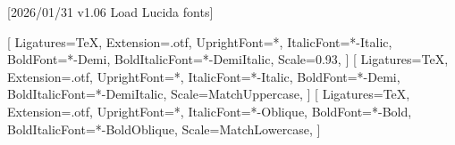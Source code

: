
[2026/01/31 v1.06 Load Lucida fonts]



\ifpdftex
	\RequirePackage[LY1]{fontenc}
	\RequirePackage{bm}
\else
    \RequirePackage[warnings-off={mathtools-colon,mathtools-overbracket},mathbf=sym]{unicode-math}

    
    \setmainfont{LucidaBrightOT}[%
          Ligatures=TeX,
          Extension=.otf,
          UprightFont=*,
          ItalicFont=*-Italic,
          BoldFont=*-Demi,
    	  BoldItalicFont=*-DemiItalic,
    	  Scale=0.93,%
      ]
    \setsansfont{LucidaSansOT}[%
          Ligatures=TeX,
          Extension=.otf,
          UprightFont=*,
          ItalicFont=*-Italic,
          BoldFont=*-Demi,
    	  BoldItalicFont=*-DemiItalic,
    	  Scale=MatchUppercase,
      ]
    \setmonofont{LucidaSansTypewriterOT}[%
          Ligatures=TeX,
          Extension=.otf,
          UprightFont=*,
          ItalicFont=*-Oblique,
          BoldFont=*-Bold,
          BoldItalicFont=*-BoldOblique,
          Scale=MatchLowercase,%
      ]
    
